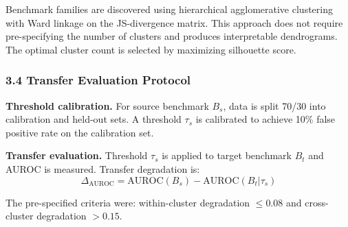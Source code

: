Benchmark families are discovered using hierarchical agglomerative clustering with Ward linkage on the JS-divergence matrix. This approach does not require pre-specifying the number of clusters and produces interpretable dendrograms. The optimal cluster count is selected by maximizing silhouette score.

\subsubsection{3.4 Transfer Evaluation Protocol}

\textbf{Threshold calibration.} For source benchmark $B_s$, data is split 70/30 into calibration and held-out sets. A threshold $\tau_s$ is calibrated to achieve 10\% false positive rate on the calibration set.

\textbf{Transfer evaluation.} Threshold $\tau_s$ is applied to target benchmark $B_t$ and AUROC is measured. Transfer degradation is:
$$\Delta_{\text{AUROC}} = \text{AUROC}(B_s) - \text{AUROC}(B_t | \tau_s)$$

The pre-specified criteria were: within-cluster degradation $\leq 0.08$ and cross-cluster degradation $> 0.15$.

